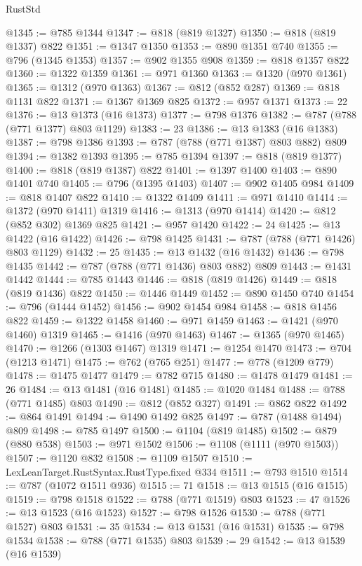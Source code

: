 \begin{lexlean}{RustStd}
\begin{coremodule}
@1345 := @785 @1344
@1347 := @818 (@819 @1327)
@1350 := @818 (@819 @1337) @822
@1351 := @1347 @1350
@1353 := @890 @1351 @740
@1355 := @796 (@1345 @1353)
@1357 := @902 @1355 @908
@1359 := @818 @1357 @822
@1360 := @1322 @1359
@1361 := @971 @1360
@1363 := @1320 (@970 @1361)
@1365 := @1312 (@970 @1363)
@1367 := @812 (@852 @287)
@1369 := @818 @1131 @822
@1371 := @1367 @1369 @825
@1372 := @957 @1371
@1373 := 22
@1376 := @13 @1373 (@16 @1373)
@1377 := @798 @1376
@1382 := @787 (@788 (@771 @1377) @803 @1129)
@1383 := 23
@1386 := @13 @1383 (@16 @1383)
@1387 := @798 @1386
@1393 := @787 (@788 (@771 @1387) @803 @882) @809
@1394 := @1382 @1393
@1395 := @785 @1394
@1397 := @818 (@819 @1377)
@1400 := @818 (@819 @1387) @822
@1401 := @1397 @1400
@1403 := @890 @1401 @740
@1405 := @796 (@1395 @1403)
@1407 := @902 @1405 @984
@1409 := @818 @1407 @822
@1410 := @1322 @1409
@1411 := @971 @1410
@1414 := @1372 (@970 @1411) @1319
@1416 := @1313 (@970 @1414)
@1420 := @812 (@852 @302) @1369 @825
@1421 := @957 @1420
@1422 := 24
@1425 := @13 @1422 (@16 @1422)
@1426 := @798 @1425
@1431 := @787 (@788 (@771 @1426) @803 @1129)
@1432 := 25
@1435 := @13 @1432 (@16 @1432)
@1436 := @798 @1435
@1442 := @787 (@788 (@771 @1436) @803 @882) @809
@1443 := @1431 @1442
@1444 := @785 @1443
@1446 := @818 (@819 @1426)
@1449 := @818 (@819 @1436) @822
@1450 := @1446 @1449
@1452 := @890 @1450 @740
@1454 := @796 (@1444 @1452)
@1456 := @902 @1454 @984
@1458 := @818 @1456 @822
@1459 := @1322 @1458
@1460 := @971 @1459
@1463 := @1421 (@970 @1460) @1319
@1465 := @1416 (@970 @1463)
@1467 := @1365 (@970 @1465)
@1470 := @1266 (@1303 @1467) @1319
@1471 := @1254 @1470
@1473 := @704 (@1213 @1471)
@1475 := @762 (@765 @251)
@1477 := @778 (@1209 @779)
@1478 := @1475 @1477
@1479 := @782 @715
@1480 := @1478 @1479
@1481 := 26
@1484 := @13 @1481 (@16 @1481)
@1485 := @1020 @1484
@1488 := @788 (@771 @1485) @803
@1490 := @812 (@852 @327)
@1491 := @862 @822
@1492 := @864 @1491
@1494 := @1490 @1492 @825
@1497 := @787 (@1488 @1494) @809
@1498 := @785 @1497
@1500 := @1104 (@819 @1485)
@1502 := @879 (@880 @538)
@1503 := @971 @1502
@1506 := @1108 (@1111 (@970 @1503))
@1507 := @1120 @832
@1508 := @1109 @1507
@1510 := LexLeanTarget.RustSyntax.RustType.fixed @334
@1511 := @793 @1510
@1514 := @787 (@1072 @1511 @936)
@1515 := 71
@1518 := @13 @1515 (@16 @1515)
@1519 := @798 @1518
@1522 := @788 (@771 @1519) @803
@1523 := 47
@1526 := @13 @1523 (@16 @1523)
@1527 := @798 @1526
@1530 := @788 (@771 @1527) @803
@1531 := 35
@1534 := @13 @1531 (@16 @1531)
@1535 := @798 @1534
@1538 := @788 (@771 @1535) @803
@1539 := 29
@1542 := @13 @1539 (@16 @1539)

\end{coremodule}
\end{lexlean}
